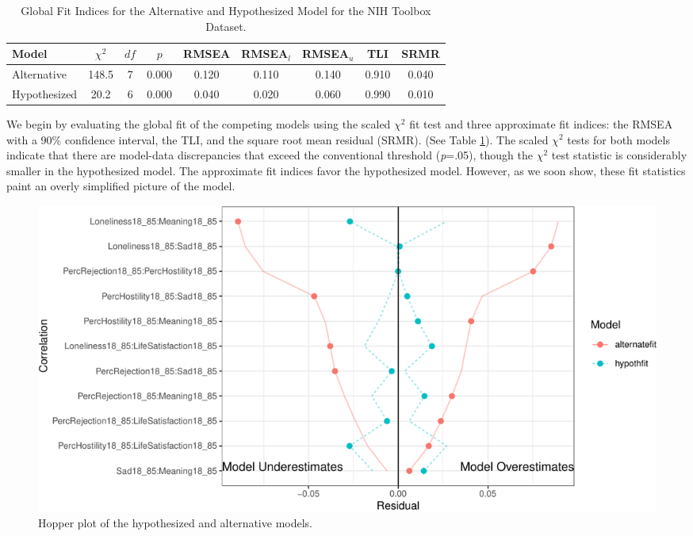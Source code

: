 \documentclass[
  english,
  man]{apa6}
\begin{document}
\begin{table}[tbp]

\begin{center}
\begin{threeparttable}

\caption{\label{tab:fitapplied}Global Fit Indices for the Alternative and Hypothesized Model for the NIH Toolbox Dataset.}

\begin{tabular}{lcccccccc}
\toprule
Model & $\chi^2$ & $df$ & $p$ & RMSEA & RMSEA$_{l}$ & RMSEA$_{u}$ & TLI & SRMR\\
\midrule
Alternative & 148.5 & 7 & 0.000 & 0.120 & 0.110 & 0.140 & 0.910 & 0.040\\
Hypothesized & 20.2 & 6 & 0.000 & 0.040 & 0.020 & 0.060 & 0.990 & 0.010\\
\bottomrule
\end{tabular}

\end{threeparttable}
\end{center}

\end{table}

We begin by evaluating the global fit of the competing models using the scaled \(\chi^2\) fit test and three approximate fit indices: the RMSEA with a 90\% confidence interval, the TLI, and the square root mean residual (SRMR). (See Table \ref{tab:fitapplied}). The scaled \(\chi^2\) tests for both models indicate that there are model-data discrepancies that exceed the conventional threshold (\emph{p}=.05), though the \(\chi^2\) test statistic is considerably smaller in the hypothesized model. The approximate fit indices favor the hypothesized model. However, as we soon show, these fit statistics paint an overly simplified picture of the model.

\begin{figure}

{\centering \includegraphics[width=0.7\linewidth]{flexplavaan_draft_files/figure-latex/hopperreal-1} 

}

\caption{Hopper plot of the hypothesized and alternative models.}\label{fig:hopperreal}
\end{figure}
\end{document}
